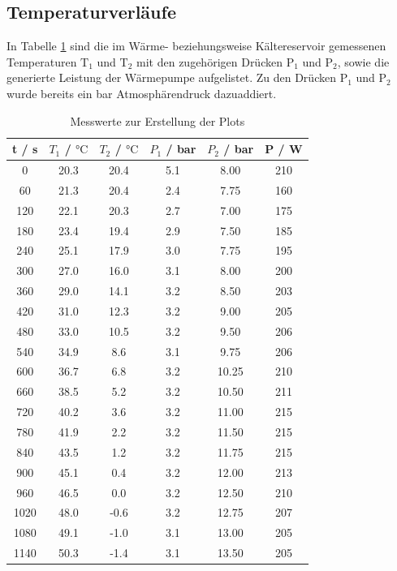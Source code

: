 \subsection{Temperaturverläufe}
In Tabelle \ref{tab1} sind die im Wärme- beziehungsweise Kältereservoir gemessenen Temperaturen
$\text{T}_1$ und $\text{T}_2$ mit den zugehörigen Drücken $\text{P}_1$ und $\text{P}_2$, sowie
die generierte Leistung der Wärmepumpe aufgelistet. Zu den Drücken $\text{P}_1$ und $\text{P}_2$
wurde bereits ein bar Atmosphärendruck dazuaddiert.
\FloatBarrier
\begin{table}
  \centering
  \caption{Messwerte zur Erstellung der Plots}
  \label{tab1}
  \begin{tabular}{ c c c c c c }
    \toprule
    {t / s} & {$T_1$ / $\si{\celsius}$} & {$T_2$ / $\si{\celsius}$} & {$P_1$ / bar} & {$P_2$ / bar} & {P / W} \\
    \midrule
     0  &   20.3   &   20.4  &  5.1  &  8.00   &  210  \\
    60  &   21.3   &   20.4  &  2.4  &  7.75   &  160  \\
   120  &   22.1   &   20.3  &  2.7  &  7.00   &  175  \\
   180  &   23.4   &   19.4  &  2.9  &  7.50   &  185  \\
   240  &   25.1   &   17.9  &  3.0  &  7.75   &  195  \\
   300  &   27.0   &   16.0  &  3.1  &  8.00   &  200  \\
   360  &   29.0   &   14.1  &  3.2  &  8.50   &  203  \\
   420  &   31.0   &   12.3  &  3.2  &  9.00   &  205  \\
   480  &   33.0   &   10.5  &  3.2  &  9.50   &  206  \\
   540  &   34.9   &    8.6  &  3.1  &  9.75   &  206  \\
   600  &   36.7   &    6.8  &  3.2  &  10.25  &  210  \\
   660  &   38.5   &    5.2  &  3.2  &  10.50  &  211  \\
   720  &   40.2   &    3.6  &  3.2  &  11.00  &  215  \\
   780  &   41.9   &    2.2  &  3.2  &  11.50  &  215  \\
   840  &   43.5   &    1.2  &  3.2  &  11.75  &  215  \\
   900  &   45.1   &    0.4  &  3.2  &  12.00  &  213  \\
   960  &   46.5   &    0.0  &  3.2  &  12.50  &  210  \\
   1020 &   48.0   &   -0.6  &  3.2  &  12.75  &  207  \\
   1080 &   49.1   &   -1.0  &  3.1  &  13.00  &  205  \\
   1140 &   50.3   &   -1.4  &  3.1  &  13.50  &  205  \\
   \bottomrule
 \end{tabular}
\end{table}

